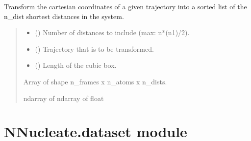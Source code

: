 \documentclass[a4paper,10pt,english]{report}
\begin{document}
\begin{fulllineitems}
\label{\detokenize{NNucleate:NNucleate.data_augmentation.transform_traj_to_ndist_list}}
\pysigstartsignatures
{}
\pysigstopsignatures
\sphinxAtStartPar
Transform the cartesian coordinates of a given trajectory into a sorted list of the n\_dist shortest distances in the system.
\begin{quote}\begin{description}
\begin{itemize}
\item {} 
\sphinxAtStartPar
{} () \textendash{} Number of distances to include (max: n*(n\sphinxhyphen{}1)/2).

\item {} 
\sphinxAtStartPar
{} () \textendash{} Trajectory that is to be transformed.

\item {} 
\sphinxAtStartPar
{} () \textendash{} Length of the cubic box.

\end{itemize}

\sphinxAtStartPar
Array of shape n\_frames x n\_atoms x n\_dists.

\sphinxAtStartPar
ndarray of ndarray of float

\end{description}\end{quote}

\end{fulllineitems}



\chapter{NNucleate.dataset module}
\label{\detokenize{NNucleate:module-NNucleate.dataset}}\label{\detokenize{NNucleate:nnucleate-dataset-module}}
\end{document}
